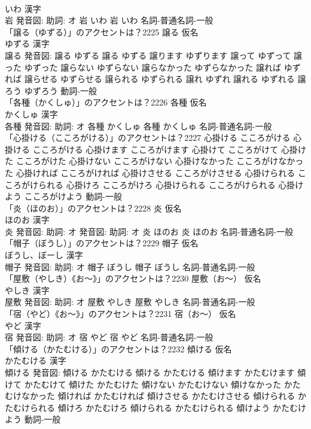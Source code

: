 \documentclass[8pt]{extreport}
\begin{document}
\begin{CJK}{UTF8}{min}
\\	いわ 漢字　
\\	岩 発音図: 助詞: オ	岩 いわ		岩 いわ				名詞-普通名詞-一般 
\\	「譲る（ゆずる）」のアクセントは？2225	譲る 仮名　
\\	ゆずる 漢字　
\\	譲る 発音図:	譲る ゆずる		譲る ゆずる 譲ります ゆずります 譲って ゆずって 譲った ゆずった 譲らない ゆずらない 譲らなかった ゆずらなかった 譲れば ゆずれば 譲らせる ゆずらせる 譲られる ゆずられる 譲れ ゆずれ 譲れる ゆずれる 譲ろう ゆずろう				動詞-一般 
\\	「各種（かくしゅ）」のアクセントは？2226	各種 仮名　
\\	かくしゅ 漢字　
\\	各種 発音図: 助詞: オ	各種 かくしゅ		各種 かくしゅ				名詞-普通名詞-一般 
\\	「心掛ける（こころがける）」のアクセントは？2227		心掛ける こころがける		心掛ける こころがける 心掛けます こころがけます 心掛けて こころがけて 心掛けた こころがけた 心掛けない こころがけない 心掛けなかった こころがけなかった 心掛ければ こころがければ 心掛けさせる こころがけさせる 心掛けられる こころがけられる 心掛けろ こころがけろ 心掛けられる こころがけられる 心掛けよう こころがけよう				動詞-一般 
\\	「炎（ほのお）」のアクセントは？2228	炎 仮名　
\\	ほのお 漢字　
\\	炎 発音図: 助詞: オ 発音図: 助詞: オ	炎 ほのお		炎 ほのお				名詞-普通名詞-一般 
\\	「帽子（ぼうし）」のアクセントは？2229	帽子 仮名　
\\	ぼうし、ぼーし 漢字　
\\	帽子 発音図: 助詞: オ	帽子 ぼうし		帽子 ぼうし				名詞-普通名詞-一般 
\\	「屋敷（やしき）《お〜》」のアクセントは？2230	屋敷（お〜） 仮名　
\\	やしき 漢字　
\\	屋敷 発音図: 助詞: オ	屋敷 やしき		屋敷 やしき				名詞-普通名詞-一般 
\\	「宿（やど）《お〜》」のアクセントは？2231	宿（お〜） 仮名　
\\	やど 漢字　
\\	宿 発音図: 助詞: オ	宿 やど		宿 やど				名詞-普通名詞-一般 
\\	「傾ける（かたむける）」のアクセントは？2232	傾ける 仮名　
\\	かたむける 漢字　
\\	傾ける 発音図:	傾ける かたむける		傾ける かたむける 傾けます かたむけます 傾けて かたむけて 傾けた かたむけた 傾けない かたむけない 傾けなかった かたむけなかった 傾ければ かたむければ 傾けさせる かたむけさせる 傾けられる かたむけられる 傾けろ かたむけろ 傾けられる かたむけられる 傾けよう かたむけよう				動詞-一般 

\end{CJK}
\end{document}
